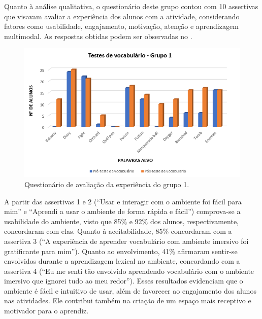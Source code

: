 Quanto à análise qualitativa, o questionário deste grupo contou com 10
assertivas que visavam avaliar a experiência dos alunos com a atividade,
considerando fatores como usabilidade, engajamento, motivação, atenção e
aprendizagem multimodal. As respostas obtidas podem ser observadas no
.

\begin{figure}[htpb]
    \centering
    \begin{minipage}{.75\textwidth}
    \includegraphics[width=\textwidth]{graph-02.png}
    \caption{Questionário de avaliação da experiência do grupo 1.}
    \label{graph-02}
    \end{minipage}
\end{figure}

A partir das assertivas 1 e 2 (``Usar e interagir com o ambiente foi
fácil para mim'' e ``Aprendi a usar o ambiente de forma rápida e
fácil'') comprova-se a usabilidade do ambiente, visto que 85\% e 92\%
dos alunos, respectivamente, concordaram com elas. Quanto à
aceitabilidade, 85\% concordaram com a assertiva 3 (``A experiência de
aprender vocabulário com ambiente imersivo foi gratificante para mim'').
Quanto ao envolvimento, 41\% afirmaram sentir-se envolvidos durante a
aprendizagem lexical no ambiente, concordando com a assertiva 4 (``Eu me
senti tão envolvido aprendendo vocabulário com o ambiente imersivo que
ignorei tudo ao meu redor''). Esses resultados evidenciam que o ambiente
é fácil e intuitivo de usar, além de favorecer ao engajamento dos alunos
nas atividades. Ele contribui também na criação de um espaço mais
receptivo e motivador para o aprendiz.

